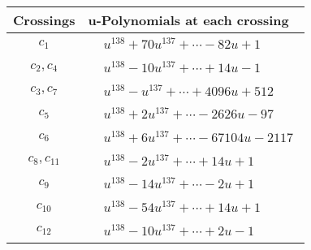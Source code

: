 \documentclass[1p]{elsarticle_modified}
\theoremstyle{definition}
\begin{document}
\begin{tabular}{m{50pt}|m{274pt}}
Crossings & \hspace{64pt}u-Polynomials at each crossing \\
\hline $$\begin{aligned}c_{1}\end{aligned}$$&$\begin{aligned}
&u^{138}+70 u^{137}+\cdots-82 u+1
\end{aligned}$\\
\hline $$\begin{aligned}c_{2},c_{4}\end{aligned}$$&$\begin{aligned}
&u^{138}-10 u^{137}+\cdots+14 u-1
\end{aligned}$\\
\hline $$\begin{aligned}c_{3},c_{7}\end{aligned}$$&$\begin{aligned}
&u^{138}- u^{137}+\cdots+4096 u+512
\end{aligned}$\\
\hline $$\begin{aligned}c_{5}\end{aligned}$$&$\begin{aligned}
&u^{138}+2 u^{137}+\cdots-2626 u-97
\end{aligned}$\\
\hline $$\begin{aligned}c_{6}\end{aligned}$$&$\begin{aligned}
&u^{138}+6 u^{137}+\cdots-67104 u-2117
\end{aligned}$\\
\hline $$\begin{aligned}c_{8},c_{11}\end{aligned}$$&$\begin{aligned}
&u^{138}-2 u^{137}+\cdots+14 u+1
\end{aligned}$\\
\hline $$\begin{aligned}c_{9}\end{aligned}$$&$\begin{aligned}
&u^{138}-14 u^{137}+\cdots-2 u+1
\end{aligned}$\\
\hline $$\begin{aligned}c_{10}\end{aligned}$$&$\begin{aligned}
&u^{138}-54 u^{137}+\cdots+14 u+1
\end{aligned}$\\
\hline $$\begin{aligned}c_{12}\end{aligned}$$&$\begin{aligned}
&u^{138}-10 u^{137}+\cdots+2 u-1
\end{aligned}$\\
\hline
\end{tabular}\\~\\
\end{document}
